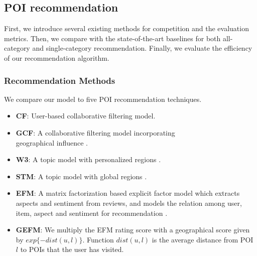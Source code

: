 
\subsection{POI recommendation}
\label{sec:poirec}
First, we introduce several existing methods for competition and
the evaluation metrics. Then, we compare with
the state-of-the-art baselines for both all-category and single-category
recommendation. Finally, we evaluate the efficiency of our
recommendation algorithm.

\subsubsection{Recommendation Methods}
We compare our model to five POI recommendation techniques.
\begin{itemize}
\item \textbf{CF}: User-based collaborative filtering model.
\item \textbf{GCF}: A collaborative filtering model incorporating \\
geographical influence \cite{YeGeoSocial:2011}.
\item \textbf{W3}: A topic model with personalized regions \cite{YuanW4:2013}.
\item \textbf{STM}: A topic model with global regions \cite{HuSTM:2013}.
\item \textbf{EFM}: A matrix factorization based explicit factor model 
which extracts aspects and sentiment from reviews, and  models
the relation among user, item, aspect and sentiment for recommendation \cite{ZhangYF14}.
\item \textbf{GEFM}: We multiply the EFM rating score with a geographical score given by
$exp\{-dist(u,l)\}$. Function $dist(u,l)$ is the average distance from POI $l$ to POIs that the user
has visited.
\end{itemize}

